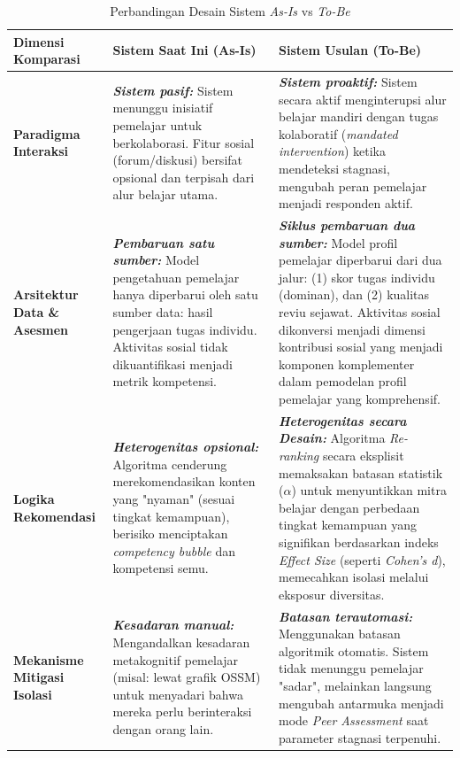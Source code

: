 \begin{table}[!ht]
    \centering
    \caption{Perbandingan Desain Sistem \textit{As-Is} vs \textit{To-Be}}
    \label{tbl:perbandingan_sistem}
    \begin{tabular}{|p{}|p{}|p{}|}
        \hline
        \textbf{Dimensi Komparasi} & \textbf{Sistem Saat Ini (As-Is)} & \textbf{Sistem Usulan (To-Be)} \\
        \hline
        \textbf{Paradigma Interaksi} & 
        \textbf{\textit{Sistem pasif:}} \newline
        Sistem menunggu inisiatif pemelajar untuk berkolaborasi. Fitur sosial (forum/diskusi) bersifat opsional dan terpisah dari alur belajar utama. & 
        \textbf{\textit{Sistem proaktif:}} \newline
        Sistem secara aktif menginterupsi alur belajar mandiri dengan tugas kolaboratif (\textit{mandated intervention}) ketika mendeteksi stagnasi, mengubah peran pemelajar menjadi responden aktif. \\
        \hline
        \textbf{Arsitektur Data \& Asesmen} & 
        \textbf{\textit{Pembaruan satu sumber:}} \newline
        Model pengetahuan pemelajar hanya diperbarui oleh satu sumber data: hasil pengerjaan tugas individu. Aktivitas sosial tidak dikuantifikasi menjadi metrik kompetensi. & 
        \textbf{\textit{Siklus pembaruan dua sumber:}} \newline
        Model profil pemelajar diperbarui dari dua jalur: (1) skor tugas individu (dominan), dan (2) kualitas reviu sejawat. Aktivitas sosial dikonversi menjadi dimensi kontribusi sosial yang menjadi komponen komplementer dalam pemodelan profil pemelajar yang komprehensif. \\
        \hline
        \textbf{Logika Rekomendasi} & 
        \textbf{\textit{Heterogenitas opsional:}} \newline
        Algoritma cenderung merekomendasikan konten yang "nyaman" (sesuai tingkat kemampuan), berisiko menciptakan \textit{competency bubble} dan kompetensi semu. & 
        \textbf{\textit{Heterogenitas secara Desain:}} \newline
        Algoritma \textit{Re-ranking} secara eksplisit memaksakan batasan statistik ($\alpha$) untuk menyuntikkan mitra belajar dengan perbedaan tingkat kemampuan yang signifikan berdasarkan indeks \textit{Effect Size} (seperti \textit{Cohen's d}), memecahkan isolasi melalui eksposur diversitas. \\
        \hline
        \textbf{Mekanisme Mitigasi Isolasi} & 
        \textbf{\textit{Kesadaran manual:}} \newline
        Mengandalkan kesadaran metakognitif pemelajar (misal: lewat grafik OSSM) untuk menyadari bahwa mereka perlu berinteraksi dengan orang lain. & 
        \textbf{\textit{Batasan terautomasi:}} \newline
        Menggunakan batasan algoritmik otomatis. Sistem tidak menunggu pemelajar "sadar", melainkan langsung mengubah antarmuka menjadi mode \textit{Peer Assessment} saat parameter stagnasi terpenuhi. \\
        \hline
    \end{tabular}
\end{table}